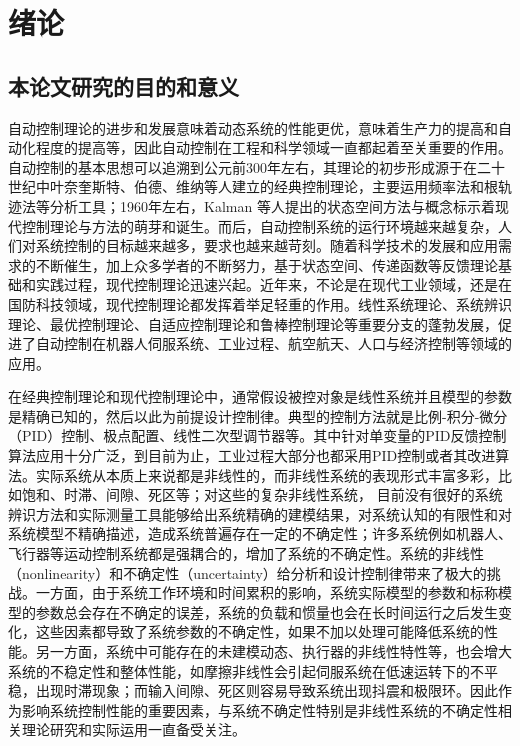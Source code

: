 \chapter{绪论}\label{chap:intro}
\section{本论文研究的目的和意义}\label{sect:1.1}

自动控制理论的进步和发展意味着动态系统的性能更优，意味着生产力的提高和自动化程度的提高等，因此自动控制在工程和科学领域一直都起着至关重要的作用。自动控制的基本思想可以追溯到公元前300年左右，其理论的初步形成源于在二十世纪中叶奈奎斯特、伯德、维纳等人建立的经典控制理论，主要运用频率法和根轨迹法等分析工具；1960年左右，Kalman 等人提出的状态空间方法与概念标示着现代控制理论与方法的萌芽和诞生。而后，自动控制系统的运行环境越来越复杂，人们对系统控制的目标越来越多，要求也越来越苛刻。随着科学技术的发展和应用需求的不断催生，加上众多学者的不断努力，基于状态空间、传递函数等反馈理论基础和实践过程，现代控制理论迅速兴起。近年来，不论是在现代工业领域，还是在国防科技领域，现代控制理论都发挥着举足轻重的作用。线性系统理论、系统辨识理论、最优控制理论、自适应控制理论和鲁棒控制理论等重要分支的蓬勃发展，促进了自动控制在机器人伺服系统、工业过程、航空航天、人口与经济控制等领域的应用。

在经典控制理论和现代控制理论中，通常假设被控对象是线性系统并且模型的参数是精确已知的，然后以此为前提设计控制律。典型的控制方法就是比例-积分-微分（PID）控制、极点配置、线性二次型调节器等。其中针对单变量的PID反馈控制算法应用十分广泛，到目前为止，工业过程大部分也都采用PID控制或者其改进算法。实际系统从本质上来说都是非线性的，而非线性系统的表现形式丰富多彩，比如饱和、时滞、间隙、死区等；对这些的复杂非线性系统， 目前没有很好的系统辨识方法和实际测量工具能够给出系统精确的建模结果，对系统认知的有限性和对系统模型不精确描述，造成系统普遍存在一定的不确定性；许多系统例如机器人、飞行器等运动控制系统都是强耦合的，增加了系统的不确定性。系统的非线性（nonlinearity）和不确定性（uncertainty）给分析和设计控制律带来了极大的挑战。一方面，由于系统工作环境和时间累积的影响，系统实际模型的参数和标称模型的参数总会存在不确定的误差，系统的负载和惯量也会在长时间运行之后发生变化，这些因素都导致了系统参数的不确定性，如果不加以处理可能降低系统的性能。另一方面，系统中可能存在的未建模动态、执行器的非线性特性等，也会增大系统的不稳定性和整体性能，如摩擦非线性会引起伺服系统在低速运转下的不平稳，出现时滞现象；而输入间隙、死区则容易导致系统出现抖震和极限环。因此作为影响系统控制性能的重要因素，与系统不确定性特别是非线性系统的不确定性相关理论研究和实际运用一直备受关注。

